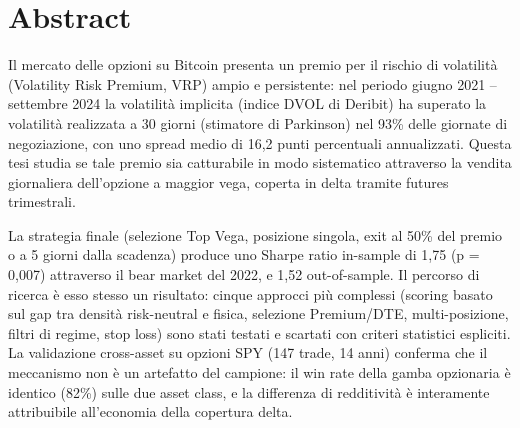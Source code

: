 \documentclass[12pt,a4paper,oneside]{book}
\begin{document}
\frontmatter

\chapter*{Abstract}

Il mercato delle opzioni su Bitcoin presenta un premio per il rischio di
volatilità (Volatility Risk Premium, VRP) ampio e persistente: nel periodo
giugno 2021 -- settembre 2024 la volatilità implicita (indice DVOL di
Deribit) ha superato la volatilità realizzata a 30 giorni (stimatore di
Parkinson) nel 93\% delle giornate di negoziazione, con uno spread medio di
16,2 punti percentuali annualizzati. Questa tesi studia se tale premio sia
catturabile in modo sistematico attraverso la vendita giornaliera
dell'opzione a maggior vega, coperta in delta tramite futures trimestrali.

La strategia finale (selezione Top Vega, posizione singola, exit al 50\%
del premio o a 5 giorni dalla scadenza) produce uno Sharpe ratio
in-sample di 1,75 (p = 0,007) attraverso il bear market del 2022, e 1,52
out-of-sample. Il percorso di ricerca è esso stesso un risultato: cinque
approcci più complessi (scoring basato sul gap tra densità risk-neutral e
fisica, selezione Premium/DTE, multi-posizione, filtri di regime, stop
loss) sono stati testati e scartati con criteri statistici espliciti. La
validazione cross-asset su opzioni SPY (147 trade, 14 anni) conferma che il
meccanismo non è un artefatto del campione: il win rate della gamba
opzionaria è identico (82\%) sulle due asset class, e la differenza di
redditività è interamente attribuibile all'economia della copertura delta.

\tableofcontents
\listoffigures
\listoftables

\mainmatter












\backmatter


\end{document}
